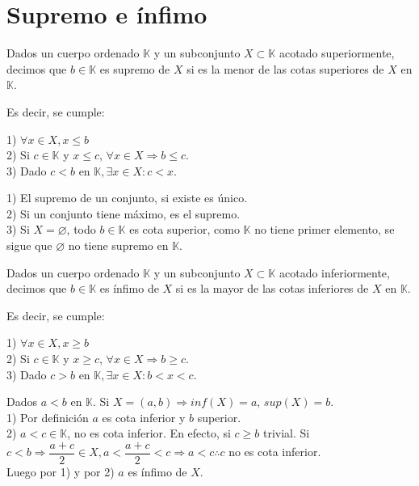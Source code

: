 \section{Supremo e ínfimo}

\begin{definition}
    Dados un cuerpo ordenado $\mathbb{K}$ y un subconjunto $X \subset \mathbb{K}$ acotado superiormente, decimos que $b \in \mathbb{K}$ es supremo de $X$ si es la menor de las cotas superiores de $X$ en $\mathbb{K}$.
\end{definition}

Es decir, se cumple:

1) $\forall x \in X, x \leq b$ \\
2) Si $c \in \mathbb{K}$ y $x \leq c$, $\forall x \in X \Rightarrow b \leq c$. \\
3) Dado $c < b$ en $\mathbb{K}, \exists x \in X : c<x$.

\begin{note}
    1) El supremo de un conjunto, si existe es único. \\
    2) Si un conjunto tiene máximo, es el supremo. \\
    3) Si $X = \varnothing$, todo $b \in \mathbb{K}$ es cota superior, como $\mathbb{K}$ no tiene primer elemento, se sigue que $\varnothing$ no tiene supremo en $\mathbb{K}$.
\end{note}

\begin{definition}
    Dados un cuerpo ordenado $\mathbb{K}$ y un subconjunto $X \subset \mathbb{K}$ acotado inferiormente, decimos que $b \in \mathbb{K}$ es ínfimo de $X$ si es la mayor de las cotas inferiores de $X$ en $\mathbb{K}$.
\end{definition}

Es decir, se cumple:

1) $\forall x \in X, x \geq b$ \\
2) Si $c \in \mathbb{K}$ y $x \geq c$, $\forall x \in X \Rightarrow b \geq c$. \\
3) Dado $c > b$ en $\mathbb{K}, \exists x \in X : b < x < c$.

\begin{eg}
    Dados $a<b$ en $\mathbb{K}$. Si $X=(a,b) \Rightarrow inf(X)=a$, $sup(X)=b$. \\
    1) Por definición $a$ es cota inferior y $b$ superior. \\
    2) $a<c \in \mathbb{K}$, no es cota inferior. En efecto, si $c \geq b$ trivial. Si $c < b \Rightarrow \dfrac{a+c}{2} \in X, a < \dfrac{a+c}{2} < c \Rightarrow a < c \therefore c$ no es cota inferior. \\
    Luego por 1) y por 2) $a$ es ínfimo de $X$.
\end{eg}

